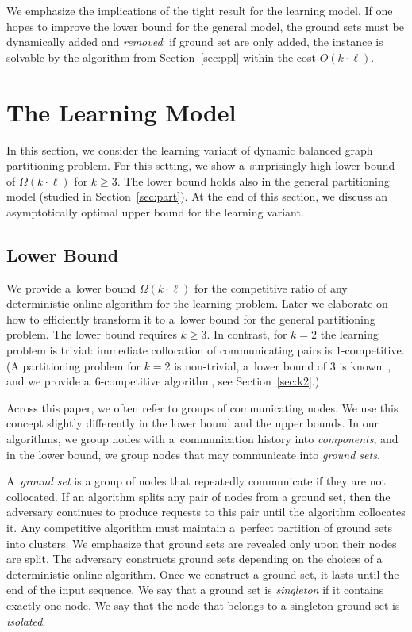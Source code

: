 \documentclass[a4paper,anonymous,USenglish]{lipics-v2019}
\begin{document}
We emphasize the implications of the tight result for the learning model.
If one hopes to improve the lower bound for the general model, the ground sets must be dynamically added and \emph{removed}: if ground set are only added, the instance is solvable by the algorithm from Section~\ref{sec:ppl} within the cost $O(k\cdot \ell)$.

\section{The Learning Model} %

In this section, we consider the learning variant of dynamic balanced graph partitioning problem.
For this setting, we show a~surprisingly high lower bound of $\Omega(k \cdot \ell)$ for $k\geq 3$.
The lower bound holds also in the general partitioning model (studied in Section~\ref{sec:part}).
At the end of this section, we discuss an asymptotically optimal upper bound for the learning variant.


\subsection{Lower Bound}

\label{sec:lowerbound}


We provide a~lower bound $\Omega(k\cdot \ell)$ for the competitive ratio of any deterministic online algorithm for the learning problem.
Later we elaborate on how to efficiently transform it to a~lower bound for the general partitioning problem.
The lower bound requires $k\geq 3$.
In contrast, for $k=2$ the learning problem is trivial: immediate collocation of communicating pairs is $1$-competitive.
(A partitioning problem for $k=2$ is non-trivial, a~lower bound of $3$ is known~\cite{repartition-disc}, and we provide a~$6$-competitive algorithm, see Section~\ref{sec:k2}.)

Across this paper, we often refer to groups of communicating nodes.
We use this concept slightly differently in the lower bound and the upper bounds.
In our algorithms, we group nodes with a~communication history into \emph{components}, and in the lower bound, we group nodes that may communicate into \emph{ground sets}.

A~\emph{ground set} is a group of nodes that repeatedly communicate if they are not collocated.
If an algorithm splits any pair of nodes from a ground set, then the adversary continues to produce requests to this pair until the algorithm collocates it.
Any competitive algorithm must maintain a~perfect partition of ground sets into clusters.
We emphasize that ground sets are revealed only upon their nodes are split.
The adversary constructs ground sets depending on the choices of a deterministic online algorithm.
Once we construct a ground set, it lasts until the end of the input sequence.
We say that a ground set is \emph{singleton} if it contains exactly one node.
We say that the node that belongs to a singleton ground set is \emph{isolated}.
\end{document}
